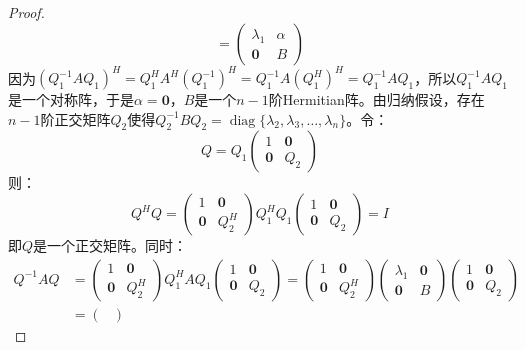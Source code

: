 \begin{proof}
\begin{equation*}
		=
		\begin{pmatrix}
			\lambda_1 & \alpha \\
			\mathbf{0} & B
		\end{pmatrix}
	\end{equation*}
	因为$(Q_1^{-1}AQ_1)^H=Q_1^HA^H(Q_1^{-1})^H=Q_1^{-1}A(Q_1^H)^H=Q_1^{-1}AQ_1$，所以$Q_1^{-1}AQ_1$是一个对称阵，于是$\alpha=\mathbf{0}$，$B$是一个$n-1$阶Hermitian阵。由归纳假设，存在$n-1$阶正交矩阵$Q_2$使得$Q_2^{-1}BQ_2=\operatorname{diag}\{\lambda_2,\lambda_3,\dots,\lambda_n\}$。令：
	\begin{equation*}
		Q=Q_1
		\begin{pmatrix}
			1 & \mathbf{0} \\
			\mathbf{0} & Q_2
		\end{pmatrix}
	\end{equation*}
	则：
	\begin{equation*}
		Q^HQ=
		\begin{pmatrix}
			1 & \mathbf{0} \\
			\mathbf{0} & Q_2^H
		\end{pmatrix}
		Q_1^HQ_1
		\begin{pmatrix}
			1 & \mathbf{0} \\
			\mathbf{0} & Q_2
		\end{pmatrix}
		=I
	\end{equation*}
	即$Q$是一个正交矩阵。同时：
	\begin{align*}
		Q^{-1}AQ
		&=
		\begin{pmatrix}
			1 & \mathbf{0} \\
			\mathbf{0} & Q_2^H
		\end{pmatrix}
		Q_1^HAQ_1
		\begin{pmatrix}
			1 & \mathbf{0} \\
			\mathbf{0} & Q_2
		\end{pmatrix}
		=
		\begin{pmatrix}
			1 & \mathbf{0} \\
			\mathbf{0} & Q_2^H
		\end{pmatrix}
		\begin{pmatrix}
			\lambda_1 & \mathbf{0} \\
			\mathbf{0} & B
		\end{pmatrix}
		\begin{pmatrix}
			1 & \mathbf{0} \\
			\mathbf{0} & Q_2
		\end{pmatrix} \\
		&=
		\begin{pmatrix}

\end{pmatrix}
\end{align*}
\end{proof}
